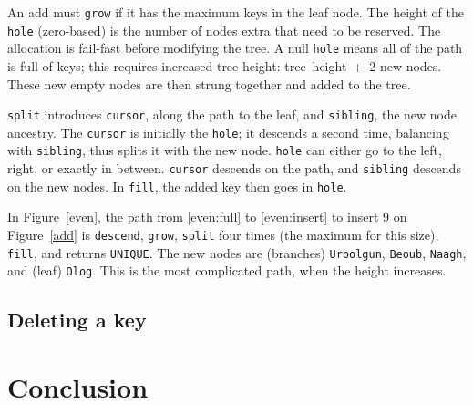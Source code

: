 \documentclass[12pt]{article}
\newcommand{\code}[1]{\colorbox{light-gray}{\texttt{#1}}}
\begin{document}
An add must \code{grow} if it has the maximum keys in the leaf node. The height of the \code{hole} (zero-based) is the number of nodes extra that need to be reserved. The allocation is fail-fast before modifying the tree. A null \code{hole} means all of the path is full of keys; this requires increased tree height: tree~height~+~2 new nodes. These new empty nodes are then strung together and added to the tree.

\code{split} introduces \code{cursor}, along the path to the leaf, and \code{sibling}, the new node ancestry. The \code{cursor} is initially the \code{hole}; it descends a second time, balancing with \code{sibling}, thus splits it with the new node. \code{hole} can either go to the left, right, or exactly in between. \code{cursor} descends on the path, and \code{sibling} descends on the new nodes. In \code{fill}, the added key then goes in \code{hole}.

In Figure~\ref{even}, the path from \ref{even:full} to \ref{even:insert} to insert 9 on Figure~\ref{add} is \code{descend}, \code{grow}, \code{split} four times (the maximum for this size), \code{fill}, and returns \code{UNIQUE}. The new nodes are (branches) \code{Urbolgun}, \code{Beoub}, \code{Naagh}, and (leaf) \code{Olog}. This is the most complicated path, when the height increases.

\subsection{Deleting a key}



\section{Conclusion}


\end{document}
